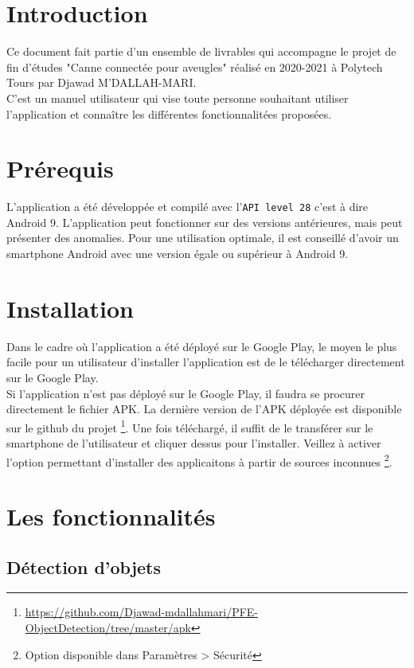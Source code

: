 \documentclass[UTF8]{EPURapport}
\begin{document}
\chapter{Introduction}

Ce document fait partie d'un ensemble de livrables qui accompagne le projet de fin d'études "Canne connectée pour aveugles" réalisé en 2020-2021 à Polytech Tours par Djawad M'DALLAH-MARI.\\

C'est un manuel utilisateur qui vise toute personne souhaitant utiliser l'application et connaître les différentes fonctionnalitées proposées.

\chapter{Prérequis}

L'application a été développée et compilé avec l'\verb|API level 28| c'est à dire Android 9. L'application peut fonctionner sur des versions antérieures, mais peut présenter des anomalies.
Pour une utilisation optimale, il est conseillé d'avoir un smartphone Android avec une version égale ou supérieur à Android 9.

\chapter{Installation}

Dans le cadre où l'application a été déployé sur le Google Play, le moyen le plus facile pour un utilisateur d'installer l'application est de le télécharger directement sur le Google Play.\\

Si l'application n'est pas déployé sur le Google Play, il faudra se procurer directement le fichier APK. La dernière version de l'APK déployée est disponible sur le github du projet \footnote{\url{https://github.com/Djawad-mdallahmari/PFE-ObjectDetection/tree/master/apk}}. Une fois téléchargé, il suffit de le transférer sur le smartphone de l'utilisateur et cliquer dessus pour l'installer. Veillez à activer l'option permettant d'installer des applicaitons à partir de sources inconnues \footnote{Option disponible dans Paramètres > Sécurité}.

\chapter{Les fonctionnalités}

\section{Détection d'objets}
\end{document}
